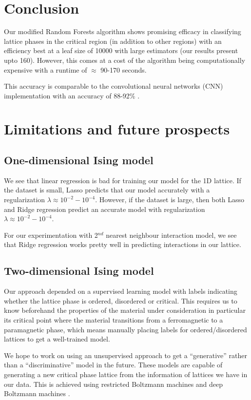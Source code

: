\section{Conclusion}
\label{sec:conclusion}

Our modified Random Forests algorithm shows promising efficacy in classifying lattice phases in the critical region (in addition to other regions) with an efficiency best at a leaf size of 10000 with large estimators (our results present upto 160).
However, this comes at a cost of the algorithm being computationally expensive with a runtime of \( \approx \) 90-170 seconds.

This accuracy is comparable to the convolutional neural networks (CNN) implementation with an accuracy of 88-92\% \cite{2019}.

\section{Limitations and future prospects}

\subsection{One-dimensional Ising model}

We see that linear regression is bad for training our model for the 1D lattice.
If the dataset is small, Lasso predicts that our model accurately with a regularization \( \lambda \approx 10^{-2} - 10^{-4}\).
However, if the dataset is large, then both Lasso and Ridge regression predict an accurate model with regularization \( \lambda \approx 10^{-2} - 10^{-4}\).

For our experimentation with 2$^{nd}$ nearest neighbour interaction model, we see that Ridge regression works pretty well in predicting interactions in our lattice.

\subsection{Two-dimensional Ising model}

Our approach depended on a supervised learning model with labels indicating whether the lattice phase is ordered, disordered or critical.
This requires us to know beforehand the properties of the material under consideration in particular its critical point where the material transitions from a ferromagnetic to a paramagnetic phase, which means manually placing labels for ordered/disordered lattices to get a well-trained model.

We hope to work on using an unsupervised approach to get a ``generative'' rather than a ``discriminative'' model in the future.
These models are capable of generating a new critical phase lattice from the information of lattices we have in our data.
This is achieved using restricted Boltzmann machines and deep Boltzmann machines \cite{morningstar2017deep, salakhutdinov2009deep}.
